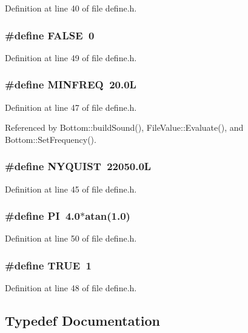 Definition at line 40 of file define.h.
\subsubsection{\setlength{\rightskip}{0pt plus 5cm}\#define FALSE\ 0}\label{define_8h_a5}




Definition at line 49 of file define.h.
\subsubsection{\setlength{\rightskip}{0pt plus 5cm}\#define MINFREQ\ 20.0L}\label{define_8h_a3}




Definition at line 47 of file define.h.

Referenced by Bottom::build\-Sound(), File\-Value::Evaluate(), and Bottom::Set\-Frequency().
\subsubsection{\setlength{\rightskip}{0pt plus 5cm}\#define NYQUIST\ 22050.0L}\label{define_8h_a1}




Definition at line 45 of file define.h.
\subsubsection{\setlength{\rightskip}{0pt plus 5cm}\#define PI\ 4.0$\ast$atan(1.0)}\label{define_8h_a6}




Definition at line 50 of file define.h.
\subsubsection{\setlength{\rightskip}{0pt plus 5cm}\#define TRUE\ 1}\label{define_8h_a4}




Definition at line 48 of file define.h.

\subsection{Typedef Documentation}
